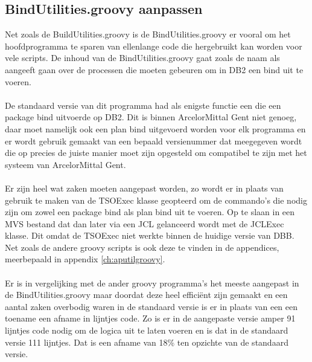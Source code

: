 \subsection{BindUtilities.groovy aanpassen}
Net zoals de BuildUtilities.groovy is de BindUtilities.groovy er vooral om het hoofdprogramma te sparen van ellenlange code die hergebruikt kan worden voor vele scripts. De inhoud van de BindUtilities.groovy gaat zoals de naam als aangeeft gaan over de processen die moeten gebeuren om in DB2 een bind uit te voeren. 
\\ \\
De standaard versie van dit programma had als enigste functie een die een package bind uitvoerde op DB2. Dit is binnen ArcelorMittal Gent niet genoeg, daar moet namelijk ook een plan bind uitgevoerd worden voor elk programma en er wordt gebruik gemaakt van een bepaald versienummer dat meegegeven wordt die op precies de juiste manier moet zijn opgesteld om compatibel te zijn met het systeem van ArcelorMittal Gent.
\\ \\
Er zijn heel wat zaken moeten aangepast worden, zo wordt er in plaats van gebruik te maken van de TSOExec klasse geopteerd om de commando's die nodig zijn om zowel een package bind als plan bind uit te voeren. Op te slaan in een MVS bestand dat dan later via een JCL gelanceerd wordt met de JCLExec klasse. Dit omdat de TSOExec niet werkte binnen de huidige versie van DBB. Net zoals de andere groovy scripts is ook deze te vinden in de appendices, meerbepaald in appendix \ref{ch:aputilgroovy}. 
\\ \\
Er is in vergelijking met de ander groovy programma's het meeste aangepast in de BindUtilities.groovy maar doordat deze heel efficiënt zijn gemaakt en een aantal zaken overbodig waren in de standaard versie is er in plaats van een een toename een afname in lijntjes code. Zo is er in de aangepaste versie amper 91 lijntjes code nodig om de logica uit te laten voeren en is dat in de standaard versie 111 lijntjes. Dat is een afname van 18\% ten opzichte van de standaard versie. 

